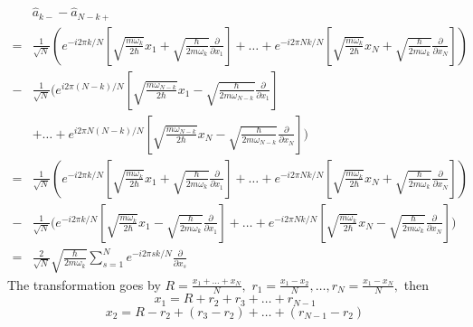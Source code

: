 \begin{enumerate}
    \begin{align*}
        &\hat a_{k-}- \hat a_{N-k+}\\
        =& 
        \frac{1}{\sqrt{N}}
        \left(
        e^{-i2\pi k/N}
        \left[
        \sqrt{\frac{m\omega_k}{2\hbar}}x_1
        +
        \sqrt{\frac{\hbar}{2m\omega_k}}\frac{\partial}{\partial x_1}
        \right]
        +\dots 
        +
        e^{-i2\pi Nk/N}
        \left[
        \sqrt{\frac{m\omega_k}{2\hbar}}x_N
        +
        \sqrt{\frac{\hbar}{2m\omega_k}}\frac{\partial}{\partial x_N}
        \right]
        \right)\\
        -&
        \frac{1}{\sqrt{N}}
        \bigg(
        e^{i2\pi (N-k)/N}
        \left[
        \sqrt{\frac{m\omega_{N-k}}{2\hbar}}x_1
        -
        \sqrt{\frac{\hbar}{2m\omega_{N-k}}}\frac{\partial}{\partial x_1}
        \right]\\
        &+\dots 
        +
        e^{i2\pi N(N-k)/N}
        \left[
        \sqrt{\frac{m\omega_{N-k}}{2\hbar}}x_N
        -
        \sqrt{\frac{\hbar}{2m\omega_{N-k}}}\frac{\partial}{\partial x_N}
        \right]
        \bigg)\\
        =&
        \frac{1}{\sqrt{N}}
        \left(
        e^{-i2\pi k/N}
        \left[
        \sqrt{\frac{m\omega_k}{2\hbar}}x_1
        +
        \sqrt{\frac{\hbar}{2m\omega_k}}\frac{\partial}{\partial x_1}
        \right]
        +\dots 
        +
        e^{-i2\pi Nk/N}
        \left[
        \sqrt{\frac{m\omega_k}{2\hbar}}x_N
        +
        \sqrt{\frac{\hbar}{2m\omega_k}}\frac{\partial}{\partial x_N}
        \right]
        \right)\\
        -&
        \frac{1}{\sqrt{N}}
        \bigg(
        e^{-i2\pi k/N}
        \left[
        \sqrt{\frac{m\omega_{k}}{2\hbar}}x_1
        -
        \sqrt{\frac{\hbar}{2m\omega_{k}}}\frac{\partial}{\partial x_1}
        \right]
        +\dots +
        e^{-i2\pi Nk/N}
        \left[
        \sqrt{\frac{m\omega_k}{2\hbar}}x_N
        -
        \sqrt{\frac{\hbar}{2m\omega_k}}\frac{\partial}{\partial x_N}
        \right]
        \bigg)\\
        =&
        \frac{2}{\sqrt{N}}
        \sqrt{\frac{\hbar}{2m\omega_k}}
        \sum_{s=1}^N
        e^{-i2\pi sk/N}
        \frac{\partial}{\partial x_s}
    \end{align*}
    The transformation goes by $R = \frac{x_1+\dots+x_N}{N},$ 
    $r_1=\frac{x_1-x_2}{N},\dots, r_{N}=\frac{x_1-x_N}{N},$ then
    $$
    x_1 = R + r_2 + r_3+\dots + r_{N-1}
    $$
    $$
    x_2 = R - r_2 + (r_3-r_2)+\dots + (r_{N-1}-r_2)
$$
\end{enumerate}
